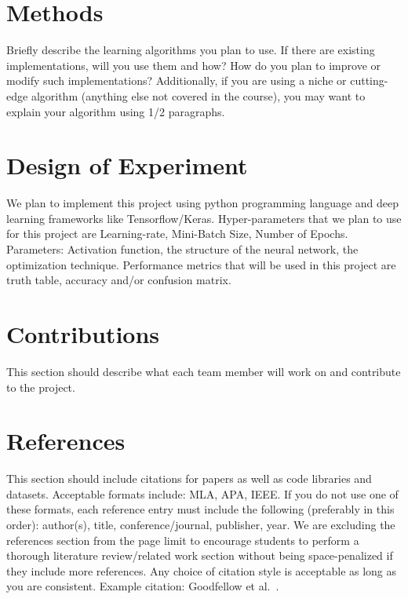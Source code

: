 \documentclass{article}
\begin{document}
\section{ Methods }
Briefly describe the learning algorithms you plan to use. 
If there are existing implementations, will you use them and how? 
How do you plan to improve or modify such implementations?
Additionally, if you are using a niche or cutting-edge algorithm (anything else not covered in the course), you may want to explain your algorithm using 1/2 paragraphs. 


\section{Design of Experiment}

We plan to implement this project using python programming language and deep learning frameworks like Tensorflow/Keras. 
Hyper-parameters that we plan to use for this project are Learning-rate, Mini-Batch Size, Number of Epochs.
Parameters: Activation function, the structure of the neural network, the optimization technique. Performance metrics that will be used in this project are truth table, accuracy and/or confusion matrix.

\section{Contributions}
This section should describe what each team member will work on and contribute to the project. 


\section*{References}
This section should include citations for papers as well as code libraries and datasets.
Acceptable formats include: MLA, APA, IEEE. 
If you do not use one of these formats, each reference entry must include the following (preferably in this order): author(s), title, conference/journal, publisher, year. 
We are excluding the references section from the page limit to encourage students to perform a thorough literature review/related work section without being space-penalized if they include more references. 
Any choice of citation style is acceptable as long as you are consistent. 
Example citation: Goodfellow et al.~\cite{GoodfellowBook2016}.


  
 
\end{document}
